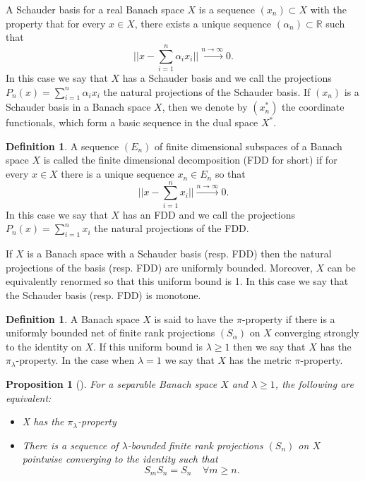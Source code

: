 \documentclass[11pt]{amsart}
\newcommand{\R}{\mathbb{R}}
\newcommand{\<}{\langle}
\renewcommand{\>}{\rangle}
\newtheorem{prop}[theorem]{Proposition}
\theoremstyle{definition}
\newtheorem{definition}[theorem]{Definition}
\theoremstyle{remark}
\numberwithin{equation}{section}
\def\R{{\mathbb R}}
\begin{document}
A Schauder basis for a real Banach space $X$ is a sequence $(x_n)\subset X$ with the property that for every $x\in X$, there exists a unique sequence $(\alpha_n)\subset \R$ such that
$$\bigg|\bigg| x-\sum\limits_{i=1}^n\alpha_ix_i \bigg|\bigg|\xrightarrow{n\to\infty}0.$$
In this case we say that $X$ has a Schauder basis  and we call the projections $P_n(x)=\sum\limits_{i=1}^n\alpha_ix_i$ the natural projections of the Schauder basis.
If $(x_n)$ is a Schauder basis in a Banach space $X$, then we denote by  $(x^*_n)$ the coordinate functionals, which form a 
basic sequence in the dual space $X^*$.

\begin{definition}
A sequence $(E_n)$ of finite dimensional subspaces of a Banach space $X$ is called the finite dimensional decomposition (FDD for short) if for every $x\in X$ there is a unique sequence $x_n\in E_n$ so that
$$\bigg|\bigg| x-\sum\limits_{i=1}^nx_i \bigg|\bigg|\xrightarrow{n\to\infty}0.$$
In this case we say that $X$ has an FDD and we call the projections $P_n(x)=\sum\limits_{i=1}^nx_i$ the natural projections of the FDD.
\end{definition}

If $X$ is a Banach space with a Schauder basis (resp. FDD) then the natural projections of the basis (resp. FDD) are uniformly bounded. Moreover, $X$ can be equivalently renormed so that this uniform bound is 1. In this case we say that the Schauder basis (resp. FDD) is monotone.

\begin{definition}
A Banach space $X$ is said to have the $\pi$-property if there is a uniformly bounded net of finite rank projections $(S_\alpha)$ on $X$ converging strongly to the identity on $X$. If this uniform bound is $\lambda\ge1$ then we  say that $X$ has the $\pi_\lambda$-property. 
In the case when  $\lambda=1$ we say that $X$ has the metric $\pi$-property.
\end{definition}

\begin{prop}[\cite{Cas01}]\label{conmutingpi}
For a separable Banach space $X$ and $\lambda\ge1$, the following are equivalent:
\begin{itemize}
\item X has the $\pi_\lambda$-property
\item There is a sequence of $\lambda$-bounded finite rank projections $(S_n)$ on $X$ pointwise converging to the identity such that
$$S_mS_n=S_n \;\;\;\;\forall m\ge n.$$
\end{itemize}
\end{prop}
\end{document}
